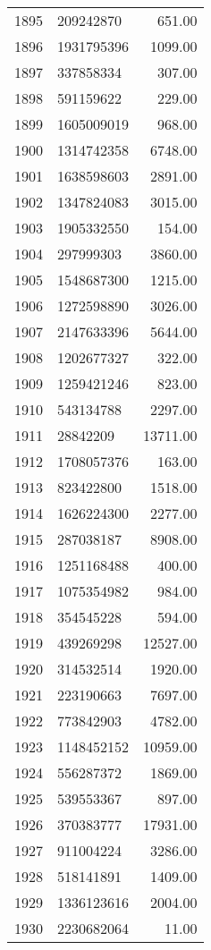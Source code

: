 \begin{table}[ht]
\begin{tabular}{rlr}
  1895 & 209242870 & 651.00 \\ 
  1896 & 1931795396 & 1099.00 \\ 
  1897 & 337858334 & 307.00 \\ 
  1898 & 591159622 & 229.00 \\ 
  1899 & 1605009019 & 968.00 \\ 
  1900 & 1314742358 & 6748.00 \\ 
  1901 & 1638598603 & 2891.00 \\ 
  1902 & 1347824083 & 3015.00 \\ 
  1903 & 1905332550 & 154.00 \\ 
  1904 & 297999303 & 3860.00 \\ 
  1905 & 1548687300 & 1215.00 \\ 
  1906 & 1272598890 & 3026.00 \\ 
  1907 & 2147633396 & 5644.00 \\ 
  1908 & 1202677327 & 322.00 \\ 
  1909 & 1259421246 & 823.00 \\ 
  1910 & 543134788 & 2297.00 \\ 
  1911 & 28842209 & 13711.00 \\ 
  1912 & 1708057376 & 163.00 \\ 
  1913 & 823422800 & 1518.00 \\ 
  1914 & 1626224300 & 2277.00 \\ 
  1915 & 287038187 & 8908.00 \\ 
  1916 & 1251168488 & 400.00 \\ 
  1917 & 1075354982 & 984.00 \\ 
  1918 & 354545228 & 594.00 \\ 
  1919 & 439269298 & 12527.00 \\ 
  1920 & 314532514 & 1920.00 \\ 
  1921 & 223190663 & 7697.00 \\ 
  1922 & 773842903 & 4782.00 \\ 
  1923 & 1148452152 & 10959.00 \\ 
  1924 & 556287372 & 1869.00 \\ 
  1925 & 539553367 & 897.00 \\ 
  1926 & 370383777 & 17931.00 \\ 
  1927 & 911004224 & 3286.00 \\ 
  1928 & 518141891 & 1409.00 \\ 
  1929 & 1336123616 & 2004.00 \\ 
  1930 & 2230682064 & 11.00 \\ 

\end{tabular}
\end{table}
